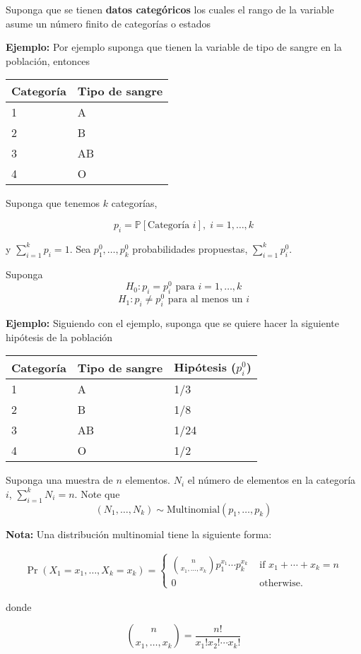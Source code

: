 \documentclass[
  12pt,
]{book}
\begin{document}
Suponga que se tienen \textbf{datos categóricos} los cuales el rango de la variable
asume un número finito de categorías o estados

\textbf{Ejemplo:} Por ejemplo suponga que tienen la variable de tipo de sangre en la población, entonces

\begin{longtable}[]{@{}ll@{}}
\toprule
Categoría & Tipo de sangre\tabularnewline
\midrule
\endhead
1 & A\tabularnewline
2 & B\tabularnewline
3 & AB\tabularnewline
4 & O\tabularnewline
\bottomrule
\end{longtable}

Suponga que tenemos \(k\) categorías,

\[p_i = \mathbb P[\text{Categoría }i],\;i=1,\dotsc,k\]

y \(\sum_{i=1}^kp_i = 1\). Sea \(p_1^0,\dotsc,p_k^0\)
probabilidades propuestas, \(\sum_{i=1}^kp_i^0\).

Suponga
\[ H_0: p_i = p_i^0\text{ para } i=1,\dots,k\]
\[ H_1: p_i \ne p_i^0\text{ para al menos un }i\]

\textbf{Ejemplo:} Siguiendo con el ejemplo, suponga que se quiere hacer la siguiente hipótesis de la población

\begin{longtable}[]{@{}lll@{}}
\toprule
Categoría & Tipo de sangre & Hipótesis (\(p_i ^{0}\))\tabularnewline
\midrule
\endhead
1 & A & 1/3\tabularnewline
2 & B & 1/8\tabularnewline
3 & AB & 1/24\tabularnewline
4 & O & 1/2\tabularnewline
\bottomrule
\end{longtable}

Suponga una muestra de \(n\) elementos. \(N_i\) el número de elementos en la categoría \(i\), \(\sum _{i=1}^kN_i = n\). Note que
\[(N_1,\dots,N_k)\sim\text{Multinomial}(p_1, \dots, p_k)\]

\textbf{Nota:} Una distribución multinomial tiene la siguiente forma:

\begin{align*}
\operatorname{Pr}\left(X_{1}=x_{1}, \ldots, X_{k}=x_{k}\right) = 
\left\{\begin{array}{rlr}
\binom {n} {x_{1}, \ldots, x_{k}} p_{1}^{x_{1}} \cdots p_{k}^{x_{k}} & \text { if } x_{1}+\cdots+x_{k}=n \\
0 & \text { otherwise. }
\end{array}\right.
\end{align*}

donde

\begin{equation*}
\binom{n}{x_{1}, \ldots, x_{k}}
=\frac{n !}{x_{1} ! x_{2} ! \cdots x_{k} !}
\end{equation*}
\end{document}

